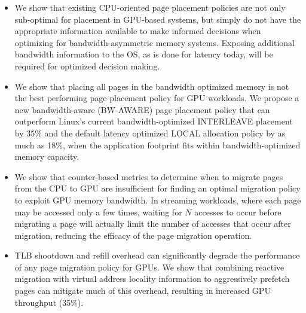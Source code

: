 \begin{itemize}
\item
We show that existing CPU-oriented page placement policies are not only 
sub-optimal for placement in GPU-based systems, but simply do not have the 
appropriate information available to make informed decisions when optimizing for 
bandwidth-asymmetric memory systems. Exposing additional bandwidth information 
to the OS, as is done for latency today, will be required for optimized decision 
making.

\item
We show that placing all pages in the bandwidth optimized memory is not the best
performing page placement policy for GPU workloads.  We propose a new
bandwidth-aware (BW-AWARE) page placement policy that can outperform Linux's
current bandwidth-optimized INTERLEAVE placement by 35\% and the default latency
optimized LOCAL allocation policy by as much as 18\%, when the application
footprint fits within bandwidth-optimized memory capacity.  


\item
We show that counter-based metrics to determine when to migrate pages from the
CPU to GPU are insufficient for finding an optimal migration policy to exploit
GPU memory bandwidth.  In streaming workloads, where each page may be accessed
only a few times, waiting for $N$ accesses to occur before migrating a page will
actually limit the number of accesses that occur after migration, reducing the
efficacy of the page migration operation.

\item
TLB shootdown and refill overhead can significantly degrade the performance of
any page migration policy for GPUs\@. We show that combining reactive migration
with virtual address locality information to aggressively prefetch pages can
mitigate much of this overhead, resulting in increased GPU throughput (35\%).


\end{itemize}
